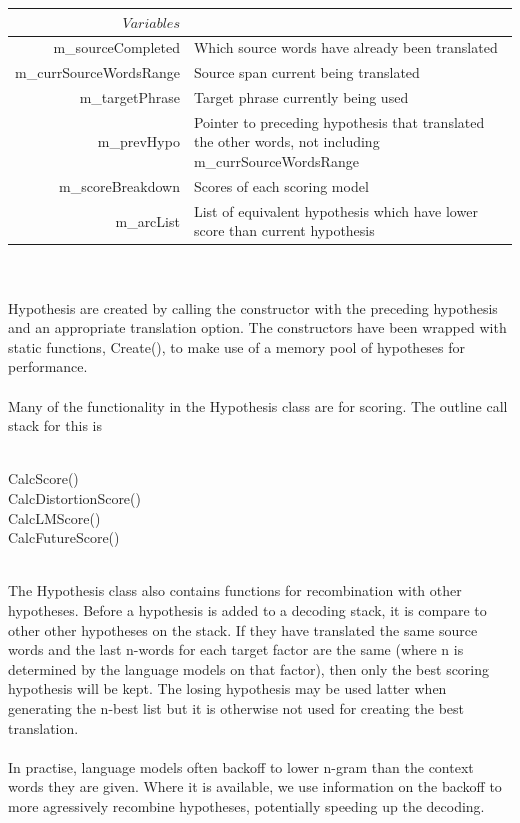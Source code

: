 \documentclass[11pt]{book}
\theoremstyle{plain}
\begin{document}
\begin{tabular}{|r|l|}
\hline
$ Variables $&$ $\\
\hline
m\_sourceCompleted & Which source words have already been translated\\
m\_currSourceWordsRange & Source span current being translated\\
m\_targetPhrase & Target phrase currently being used\\
m\_prevHypo & Pointer to preceding hypothesis that translated the other words, not including m\_currSourceWordsRange\\
m\_scoreBreakdown & Scores of each scoring model\\
m\_arcList & List of equivalent hypothesis which have lower score than current hypothesis\\
\hline
\end{tabular}\\
\\
Hypothesis are created by calling the constructor with the preceding hypothesis and an appropriate translation option. The constructors have been wrapped with static functions, Create(), to make use of a memory pool of hypotheses for performance.\\
\\
Many of the functionality in the Hypothesis class are for scoring. The outline call stack for this is\\
\\
\begin{tt}
\indent CalcScore()\\
\indent	\indent	CalcDistortionScore()\\
\indent	\indent	CalcLMScore()\\
\indent	\indent	CalcFutureScore()\\
\end{tt}
\\
The Hypothesis class also contains functions for recombination with other hypotheses. Before a hypothesis is added to a decoding stack, it is compare to other other hypotheses on the stack. If they have translated the same source words and the last n-words for each target factor are the same (where n is determined by the language models on that factor), then only the best scoring hypothesis will be kept. The losing hypothesis may be used latter when generating the n-best list but it is otherwise not used for creating the best translation.\\
\\
In practise, language models often backoff to lower n-gram than the context words they are given. Where it is available, we use information on the backoff to more agressively recombine hypotheses, potentially speeding up the decoding.\\
\end{document}
